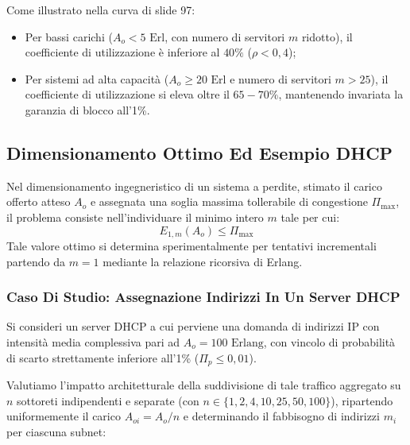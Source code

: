 \documentclass[11pt, a4paper]{article}
\begin{document}
Come illustrato nella curva di slide 97:
\begin{itemize}
    \item Per bassi carichi ($A_o < 5\text{ Erl}$, con numero di servitori $m$ ridotto), il coefficiente di utilizzazione è inferiore al $40\%$ ($\rho < 0{,}4$);
    \item Per sistemi ad alta capacità ($A_o \ge 20\text{ Erl}$ e numero di servitori $m > 25$), il coefficiente di utilizzazione si eleva oltre il $65-70\%$, mantenendo invariata la garanzia di blocco all'1\%.
\end{itemize}

\subsection{Dimensionamento Ottimo Ed Esempio DHCP}

Nel dimensionamento ingegneristico di un sistema a perdite, stimato il carico offerto atteso $A_o$ e assegnata una soglia massima tollerabile di congestione $\Pi_{\max}$, il problema consiste nell'individuare il minimo intero $m$ tale per cui:
\[
\boxed{E_{1,m}(A_o) \le \Pi_{\max}}
\]
Tale valore ottimo si determina sperimentalmente per tentativi incrementali partendo da $m=1$ mediante la relazione ricorsiva di Erlang.

\subsubsection{Caso Di Studio: Assegnazione Indirizzi In Un Server DHCP}
Si consideri un server DHCP a cui perviene una domanda di indirizzi IP con intensità media complessiva pari ad $A_o = 100\text{ Erlang}$, con vincolo di probabilità di scarto strettamente inferiore all'1\% ($\Pi_p \le 0{,}01$).

Valutiamo l'impatto architetturale della suddivisione di tale traffico aggregato su $n$ sottoreti indipendenti e separate (con $n \in \{1, 2, 4, 10, 25, 50, 100\}$), ripartendo uniformemente il carico $A_{oi} = A_o / n$ e determinando il fabbisogno di indirizzi $m_i$ per ciascuna subnet:
\end{document}
